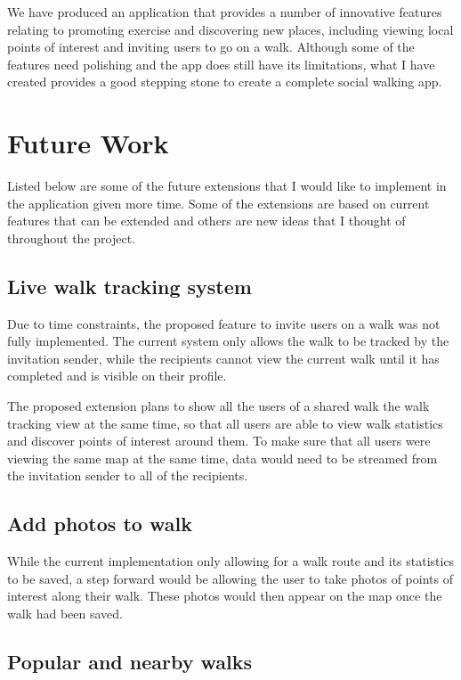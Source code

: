 We have produced an application that provides a number of innovative features relating to promoting exercise and discovering new places, including viewing local points of interest and inviting users to go on a walk. Although some of the features need polishing and the app does still have its limitations, what I have created provides a good stepping stone to create a complete social walking app.

\section{Future Work} \label{section:future-work}

Listed below are some of the future extensions that I would like to implement in the application given more time. Some of the extensions are based on current features that can be extended and others are new ideas that I thought of throughout the project.

\subsection{Live walk tracking system}

Due to time constraints, the proposed feature to invite users on a walk was not fully implemented. The current system only allows the walk to be tracked by the invitation sender, while the recipients cannot view the current walk until it has completed and is visible on their profile.

The proposed extension plans to show all the users of a shared walk the walk tracking view at the same time, so that all users are able to view walk statistics and discover points of interest around them. To make sure that all users were viewing the same map at the same time, data would need to be streamed from the invitation sender to all of the recipients.

\subsection{Add photos to walk}

While the current implementation only allowing for a walk route and its statistics to be saved, a step forward would be allowing the user to take photos of points of interest along their walk. These photos would then appear on the map once the walk had been saved.

\subsection{Popular and nearby walks}

